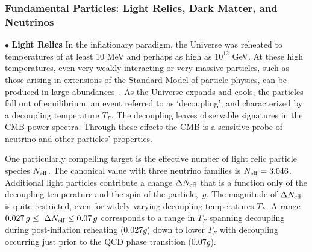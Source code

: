 \documentclass[PICOReport.tex]{subfiles}
\begin{document}
\subsubsection{Fundamental Particles: Light Relics, Dark Matter, and Neutrinos}
\label{sec:relics_neutrinos}

$\bullet$ {\bf Light Relics} \hspace{0.1in} In the inflationary paradigm, the Universe was reheated to temperatures of 
at least 10 MeV and perhaps as 
high as $10^{12}$ GeV.  At these high temperatures, even very weakly interacting or very massive particles, 
such as those arising in extensions of the Standard Model of particle physics, can be produced in large 
abundances~\cite{1979ARNPS..29..313S,Bolz:2000fu}.  As the Universe expands and cools,
the particles fall out of equilibrium, an event referred to as `decoupling', and characterized by a decoupling temperature $T_{F}$.  The decoupling leaves observable signatures in the CMB power spectra. Through these effects the CMB is a sensitive probe of neutrino and other particles' properties.  


One particularly compelling target is the effective number of light relic particle species ${N_{\rm eff}}$. The canonical value with three neutrino families is ${N_{\rm eff}} = 3.046$. Additional light particles contribute a change $\Delta {N_{\rm eff}}$ that is a function only of the decoupling temperature and the spin of the particle,~$g$. The magnitude of $\Delta{N_{\rm eff}}$ is quite restricted, even for widely varying decoupling temperatures $T_{F}$. A range $ 0.027\,g \leq \ \Delta {N_{\rm eff}} \leq 0.07\,g$ corresponds to a range in $T_{F}$ spanning decoupling during post-inflation reheating (0.027$g$) down to lower $T_{F}$ with decoupling occurring just prior to the QCD phase transition ($0.07g$).
\end{document}

